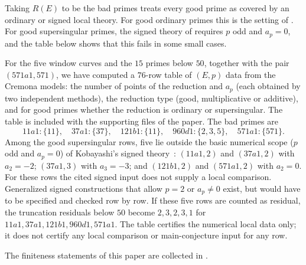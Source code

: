 Taking $R(E)$ to be the bad primes treats every good prime as covered by
an ordinary or signed local theory.  For good ordinary primes this is the
setting of .  For good
supersingular primes, the signed theory of
 requires $p$ odd and $a_p=0$, and the
table below shows that this fails in some small cases.

\begin{remark}\label{rmk:apparatus:support-prime-atlas}
For the five window curves and the $15$ primes below $50$, together with
the pair $(571a1,571)$, we have computed a $76$-row table of
$(E,p)$ data from the Cremona models: the number of points of the
reduction and $a_p$ (each obtained by two independent methods), the
reduction type (good, multiplicative or additive), and for good primes
whether the reduction is ordinary or supersingular.  The table is
included with the supporting files of the paper.  The bad primes are
\[
  11a1:\{11\},\quad
  37a1:\{37\},\quad
  121b1:\{11\},\quad
  960d1:\{2,3,5\},\quad
  571a1:\{571\}.
\]
Among the good supersingular rows, five lie outside the basic numerical
scope ($p$ odd and $a_p=0$) of Kobayashi's signed
theory~\citep{Kobayashi2003}: $(11a1,2)$ and $(37a1,2)$ with $a_2=-2$;
$(37a1,3)$ with $a_3=-3$; and $(121b1,2)$ and $(571a1,2)$ with $a_2=0$.
For these rows the cited signed input does not supply a local comparison.
Generalized signed constructions that allow $p=2$ or $a_p\neq0$ exist,
but would have to be specified and checked row by row.  If these five
rows are counted as residual, the truncation residuals below $50$ become
$2,3,2,3,1$ for $11a1,37a1,121b1,960d1,571a1$.  The table certifies
the numerical local data only; it does not certify any local comparison
or main-conjecture input for any row.
\end{remark}

The finiteness statements of this paper are collected in
.

